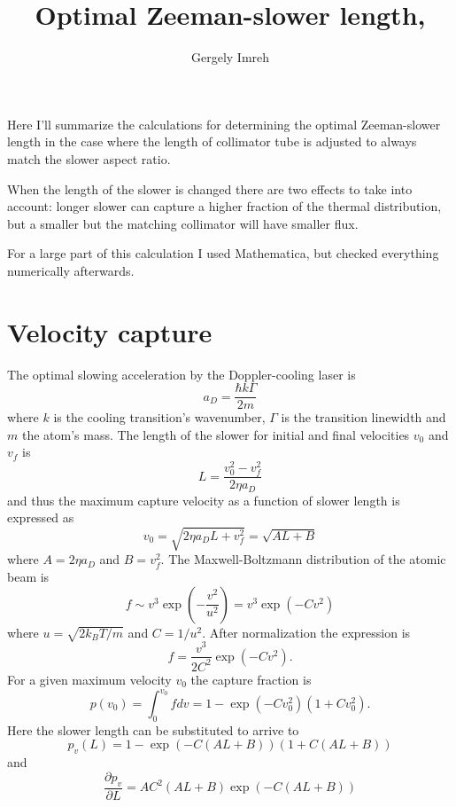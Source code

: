 \documentclass[10pt,a4paper]{article}
\author{Gergely Imreh}
\title{Optimal Zeeman-slower length, \version}
\begin{document}
\maketitle

Here I'll summarize the calculations for determining the optimal Zeeman-slower length in the case where the length of collimator tube is adjusted to always match the slower aspect ratio.

When the length of the slower is changed there are two effects to take into account: longer slower can capture a higher fraction of the thermal distribution, but a smaller but the matching collimator will have smaller flux.

For a large part of this calculation I used Mathematica, but checked everything numerically afterwards.

\section{Velocity capture}

The optimal slowing acceleration by the Doppler-cooling laser is
\begin{equation}
a_D = \frac{\hbar k \Gamma}{2 m}
\end{equation}
where $k$ is the cooling transition's wavenumber, $\Gamma$ is the transition linewidth and $m$ the atom's mass. The length of the slower for initial and final velocities $v_0$ and $v_f$ is
\begin{equation}
L = \frac{v_0^2 - v_f^2}{2 \eta a_D}
\end{equation}
and thus the maximum capture velocity as a function of slower length is expressed as
\begin{equation}
v_0 = \sqrt{2 \eta a_D L + v_f^2} = \sqrt{A L + B}
\end{equation}
where $A = 2 \eta a_D$ and $B = v_f^2$. The Maxwell-Boltzmann distribution of the atomic beam is
\begin{equation}
f \sim v^3 \exp\left(-\frac{v^2}{u^2}\right) = v^3 \exp(-C v^2)
\end{equation}
where $u = \sqrt{2 k_B T / m}$ and $C = 1/u^2$. After normalization the expression is
\begin{equation}
f = \frac{v^3}{2 C^2} \exp(-C v^2).
\end{equation}
For a given maximum velocity $v_0$ the capture fraction is
\begin{equation}
p(v_0) = \int_0^{v_0} f dv = 1 - \exp(-C v_0^2)(1 + C v_0^2).
\end{equation}
Here the slower length can be substituted to arrive to
\begin{equation}
p_v(L) = 1 - \exp(-C (A L + B))(1 + C (A L + B))
\label{eq:velocityfraction}
\end{equation}
and
\begin{equation}
\frac{\partial p_v}{\partial L} = A C^2 (A L + B)\exp(-C (A L + B)) 
\end{equation}
\end{document}
